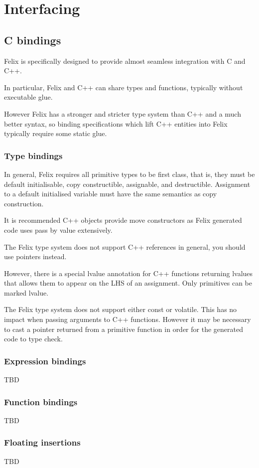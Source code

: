 \documentclass[oneside]{book}
\begin{document}
{\part{Interfacing}
\chapter{C bindings}
Felix is specifically designed to provide almost seamless integration
with C and C++.

In particular, Felix and C++ can share types and functions,
typically without executable glue.

However Felix has a stronger and stricter type system than C++
and a much better syntax, so binding specifications which lift
C++ entities into Felix typically require some static glue.

\section{Type bindings}
In general, Felix requires all primitive types to be first class,
that is, they must be default initialisable, copy constructible,
assignable, and destructible. Assignment to a default initialised
variable must have the same semantics as copy construction.

It is recommended C++ objects provide move constructors as
Felix generated code uses pass by value extensively.

The Felix type system does not support C++ references in general,
you should use pointers instead. 

However, there is a special lvalue annotation for C++ functions
returning lvalues that allows them to appear on the LHS of
an assignment. Only primitives can be marked lvalue.

The Felix type system does not support either const or volatile.
This has no impact when passing arguments to C++ functions.
However it may be necessary to cast a pointer returned from
a primitive function in order for the generated code to type check.



\section{Expression bindings}
TBD
\section{Function bindings}
TBD
\section{Floating insertions}
TBD
}
\end{document}
